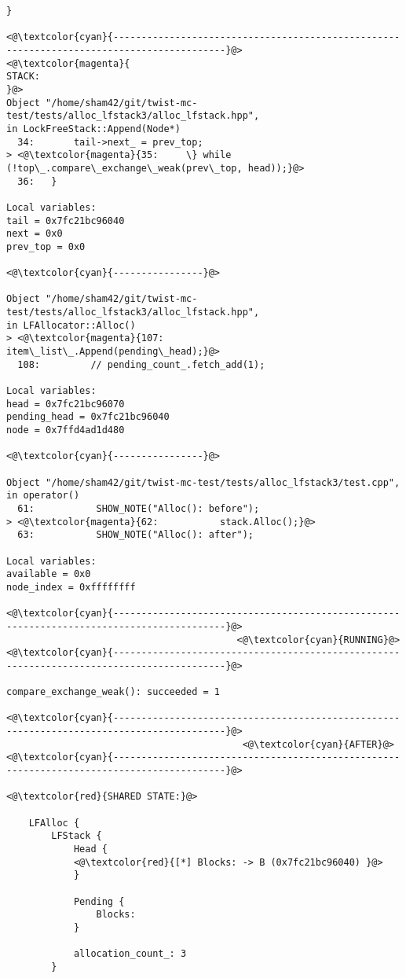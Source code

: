 \begin{adjustwidth}{-3.3cm}{-1cm}
\begin{allintypewriter}
\begin{multicols*}{2}
\begin{lstlisting}[numbers=none]
    }

<@\textcolor{cyan}{------------------------------------------------------------------------------------------}@>
<@\textcolor{magenta}{
STACK:
}@>
Object "/home/sham42/git/twist-mc-test/tests/alloc_lfstack3/alloc_lfstack.hpp",
in LockFreeStack::Append(Node*)
  34:       tail->next_ = prev_top;
> <@\textcolor{magenta}{35:     \} while (!top\_.compare\_exchange\_weak(prev\_top, head));}@>
  36:   }

Local variables: 
tail = 0x7fc21bc96040
next = 0x0
prev_top = 0x0

<@\textcolor{cyan}{----------------}@>

Object "/home/sham42/git/twist-mc-test/tests/alloc_lfstack3/alloc_lfstack.hpp",
in LFAllocator::Alloc()
> <@\textcolor{magenta}{107:         item\_list\_.Append(pending\_head);}@>
  108:         // pending_count_.fetch_add(1);

Local variables: 
head = 0x7fc21bc96070
pending_head = 0x7fc21bc96040
node = 0x7ffd4ad1d480

<@\textcolor{cyan}{----------------}@>

Object "/home/sham42/git/twist-mc-test/tests/alloc_lfstack3/test.cpp",
in operator()
  61:           SHOW_NOTE("Alloc(): before");
> <@\textcolor{magenta}{62:           stack.Alloc();}@>
  63:           SHOW_NOTE("Alloc(): after");

Local variables: 
available = 0x0
node_index = 0xffffffff

<@\textcolor{cyan}{------------------------------------------------------------------------------------------}@>
                                         <@\textcolor{cyan}{RUNNING}@>
<@\textcolor{cyan}{------------------------------------------------------------------------------------------}@>

compare_exchange_weak(): succeeded = 1

<@\textcolor{cyan}{------------------------------------------------------------------------------------------}@>
                                          <@\textcolor{cyan}{AFTER}@>
<@\textcolor{cyan}{------------------------------------------------------------------------------------------}@>

<@\textcolor{red}{SHARED STATE:}@>

    LFAlloc {
	    LFStack {
		    Head {
			<@\textcolor{red}{[*] Blocks: -> B (0x7fc21bc96040) }@>
		    }

		    Pending {
			    Blocks: 
		    }

		    allocation_count_: 3
	    }


\end{lstlisting}
\end{multicols*}
\end{allintypewriter}
\end{adjustwidth}
